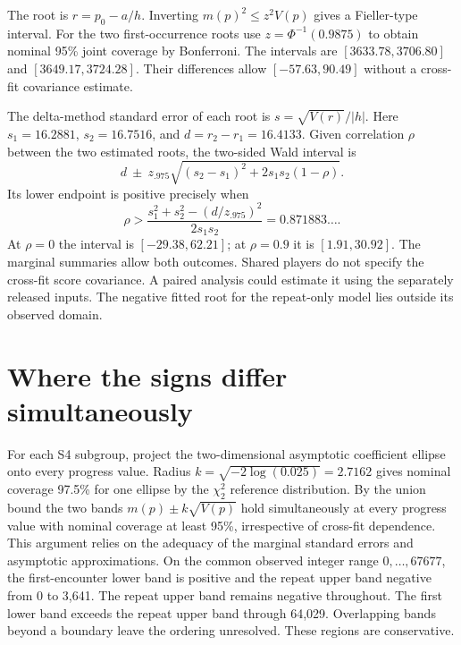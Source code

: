\documentclass[11pt]{article}
\begin{document}
The root is $r=p_0-a/h$. Inverting $m(p)^2\le z^2V(p)$ gives a Fieller-type interval. For the two first-occurrence roots use $z=\Phi^{-1}(0.9875)$ to obtain nominal 95\% joint coverage by Bonferroni. The intervals are $[3633.78,3706.80]$ and $[3649.17,3724.28]$. Their differences allow $[-57.63,90.49]$ without a cross-fit covariance estimate.

The delta-method standard error of each root is $s=\sqrt{V(r)}/|h|$. Here $s_1=16.2881$, $s_2=16.7516$, and $d=r_2-r_1=16.4133$. Given correlation $\rho$ between the two estimated roots, the two-sided Wald interval is
\[
d\ \pm\ z_{.975}\sqrt{(s_2-s_1)^2+2s_1s_2(1-\rho)} .
\]
Its lower endpoint is positive precisely when
\[
\rho>\frac{s_1^2+s_2^2-(d/z_{.975})^2}{2s_1s_2}=0.871883\ldots .
\]
At $\rho=0$ the interval is $[-29.38,62.21]$; at $\rho=0.9$ it is $[1.91,30.92]$. The marginal summaries allow both outcomes. Shared players do not specify the cross-fit score covariance. A paired analysis could estimate it using the separately released inputs. The negative fitted root for the repeat-only model lies outside its observed domain.
\section{Where the signs differ simultaneously}
For each S4 subgroup, project the two-dimensional asymptotic coefficient ellipse onto every progress value. Radius $k=\sqrt{-2\log(0.025)}=2.7162$ gives nominal coverage 97.5\% for one ellipse by the $\chi^2_2$ reference distribution. By the union bound the two bands $m(p)\pm k\sqrt{V(p)}$ hold simultaneously at every progress value with nominal coverage at least 95\%, irrespective of cross-fit dependence. This argument relies on the adequacy of the marginal standard errors and asymptotic approximations.
\newpage
On the common observed integer range $0,\ldots,67677$, the first-encounter lower band is positive and the repeat upper band negative from 0 to 3,641. The repeat upper band remains negative throughout. The first lower band exceeds the repeat upper band through 64,029. Overlapping bands beyond a boundary leave the ordering unresolved. These regions are conservative.
\end{document}
